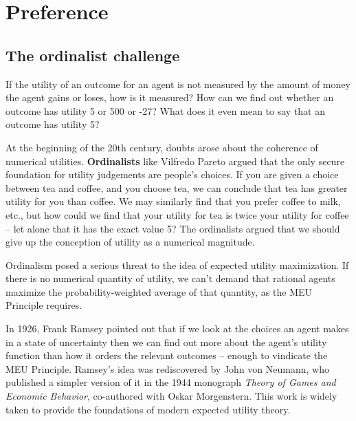 \chapter{Preference}\label{ch:preference}

%

\section{The ordinalist challenge}

If the utility of an outcome for an agent is not measured by the amount of money
the agent gains or loses, how is it measured? How can we find out whether an
outcome has utility 5 or 500 or -27? What does it even mean to say that an
outcome has utility 5?

At the beginning of the 20th century, doubts arose about the coherence of
numerical utilities. \textbf{Ordinalists} like Vilfredo Pareto argued that the
only secure foundation for utility judgements are people's choices. If you are
given a choice between tea and coffee, and you choose tea, we can conclude that
tea has greater utility for you than coffee. We may similarly find that you
prefer coffee to milk, etc., but how could we find that your utility for tea is
twice your utility for coffee -- let alone that it has the exact value 5? The
ordinalists argued that we should give up the conception of utility as a
numerical magnitude.


Ordinalism posed a serious threat to the idea of expected utility maximization.
If there is no numerical quantity of utility, we can't demand that rational
agents maximize the probability-weighted average of that quantity, as the MEU
Principle requires.

In 1926, Frank Ramsey pointed out that if we look at the choices an agent makes
in a state of uncertainty then we can find out more about the agent's utility
function than how it orders the relevant outcomes -- enough to vindicate the MEU
Principle. Ramsey's idea was rediscovered by John von Neumann, who published a
simpler version of it in the 1944 monograph \emph{Theory of Games and Economic
  Behavior}, co-authored with Oskar Morgenstern. This work is widely taken to
provide the foundations of modern expected utility theory.

